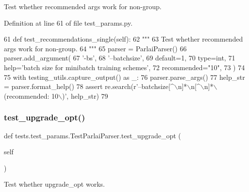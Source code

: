 \begin{DoxyVerb}Test whether recommended args work for non-group.
\end{DoxyVerb}
 

Definition at line 61 of file test\+\_\+params.\+py.


\begin{DoxyCode}
61     \textcolor{keyword}{def }test\_recommendations\_single(self):
62         \textcolor{stringliteral}{"""}
63 \textcolor{stringliteral}{        Test whether recommended args work for non-group.}
64 \textcolor{stringliteral}{        """}
65         parser = ParlaiParser()
66         parser.add\_argument(
67             \textcolor{stringliteral}{'-bs'},
68             \textcolor{stringliteral}{'--batchsize'},
69             default=1,
70             type=int,
71             help=\textcolor{stringliteral}{'batch size for minibatch training schemes'},
72             recommended=\textcolor{stringliteral}{"10"},
73         )
74 
75         with testing\_utils.capture\_output() \textcolor{keyword}{as} \_:
76             parser.parse\_args()
77         help\_str = parser.format\_help()
78         \textcolor{keyword}{assert} re.search(\textcolor{stringliteral}{r'--batchsize[^\(\backslash\)n]*\(\backslash\)n[^\(\backslash\)n]*\(\backslash\)(recommended: 10\(\backslash\))'}, help\_str)
79 
\end{DoxyCode}
\mbox{\label{classtests_1_1test__params_1_1TestParlaiParser_acf8ab1cdd831a5743f56623c0af87d5e}} 
\subsubsection{\texorpdfstring{test\+\_\+upgrade\+\_\+opt()}{test\_upgrade\_opt()}}
{\footnotesize\ttfamily def tests.\+test\+\_\+params.\+Test\+Parlai\+Parser.\+test\+\_\+upgrade\+\_\+opt (\begin{DoxyParamCaption}\item[{}]{self }\end{DoxyParamCaption})}

\begin{DoxyVerb}Test whether upgrade_opt works.
\end{DoxyVerb}
 

